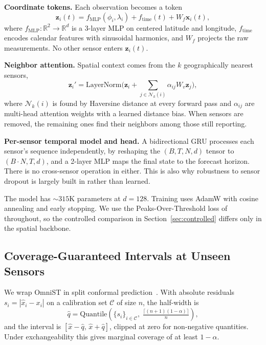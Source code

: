 \documentclass[journal]{IEEEtran}
\begin{document}
\textbf{Coordinate tokens.} Each observation becomes a token
\begin{equation}
\mathbf{z}_i(t) = f_{\text{MLP}}(\phi_i, \lambda_i) + f_{\text{time}}(t) + W_f \mathbf{x}_i(t),
\end{equation}
where $f_{\text{MLP}}:\mathbb{R}^2\to\mathbb{R}^d$ is a 3-layer MLP on centered latitude and longitude,
$f_{\text{time}}$ encodes calendar features with sinusoidal harmonics, and $W_f$ projects the raw
measurements. No other sensor enters $\mathbf{z}_i(t)$.

\textbf{Neighbor attention.} Spatial context comes from the $k$ geographically nearest sensors,
\begin{equation}
\mathbf{z}_i' = \text{LayerNorm}\Big(\mathbf{z}_i + \sum_{j \in \mathcal{N}_k(i)} \alpha_{ij} W_v \mathbf{z}_j\Big),
\end{equation}
where $\mathcal{N}_k(i)$ is found by Haversine distance at every forward pass and $\alpha_{ij}$ are
multi-head attention weights with a learned distance bias. When sensors are removed, the remaining
ones find their neighbors among those still reporting.

\textbf{Per-sensor temporal model and head.} A bidirectional GRU processes each sensor's sequence
independently, by reshaping the $(B,T,N,d)$ tensor to $(B{\cdot}N,T,d)$, and a 2-layer MLP maps the
final state to the forecast horizon. There is no cross-sensor operation in either. This is also why
robustness to sensor dropout is largely built in rather than learned.

The model has ${\sim}315$K parameters at $d{=}128$. Training uses AdamW with cosine annealing and
early stopping. We use the Peaks-Over-Threshold loss of~\cite{panja2026estgcn} throughout, so the
controlled comparison in Section~\ref{sec:controlled} differs only in the spatial backbone.

\subsection{Coverage-Guaranteed Intervals at Unseen Sensors}
\label{sec:conformal}

We wrap OmniST in split conformal prediction~\cite{vovk2005algorithmic,angelopoulos2023conformal}.
With absolute residuals $s_i = |\hat{x}_i - x_i|$ on a calibration set $\mathcal{C}$ of size $n$, the
half-width is
\begin{equation}
\hat{q} = \mathrm{Quantile}\!\left(\{s_i\}_{i \in \mathcal{C}},\; \tfrac{\lceil (n+1)(1-\alpha)\rceil}{n}\right),
\end{equation}
and the interval is $[\hat{x} - \hat{q},\, \hat{x} + \hat{q}]$, clipped at zero for non-negative
quantities. Under exchangeability this gives marginal coverage of at least $1-\alpha$.
\end{document}
